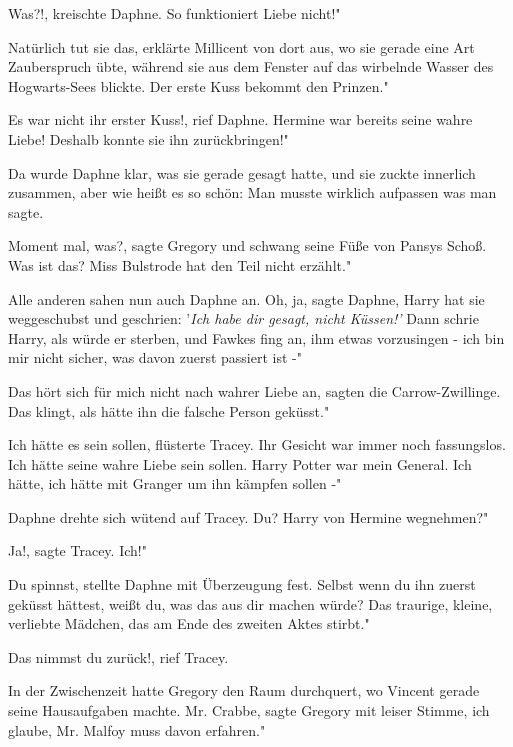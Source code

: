 \glqq{}Was?!\grqq{}, kreischte Daphne. \glqq{}So funktioniert Liebe nicht!"

\glqq{}Natürlich tut sie das\grqq{}, erklärte Millicent von dort aus, wo sie
gerade eine Art Zauberspruch übte, während sie aus dem Fenster auf das wirbelnde
Wasser des Hogwarts-Sees blickte. \glqq{}Der erste Kuss bekommt den Prinzen."

\glqq{}Es war nicht ihr erster Kuss!\grqq{}, rief Daphne. \glqq{}Hermine war
bereits seine wahre Liebe! Deshalb konnte sie ihn zurückbringen!"

Da wurde Daphne klar, was sie gerade gesagt hatte, und sie zuckte innerlich
zusammen, aber wie heißt es so schön: Man musste wirklich aufpassen was man
sagte.

\glqq{}Moment mal, was?\grqq{}, sagte Gregory und schwang seine Füße von Pansys
Schoß. \glqq{}Was ist das? Miss Bulstrode hat den Teil nicht erzählt."

Alle anderen sahen nun auch Daphne an. \glqq{}Oh, ja\grqq{}, sagte Daphne, \glqq
Harry hat sie weggeschubst und geschrien: '\emph{Ich habe dir gesagt, nicht
Küssen!'} Dann schrie Harry, als würde er sterben, und Fawkes fing an, ihm etwas
vorzusingen - ich bin mir nicht sicher, was davon zuerst passiert ist -"

\glqq{}Das hört sich für mich nicht nach wahrer Liebe an\grqq{}, sagten die
Carrow-Zwillinge. \glqq{}Das klingt, als hätte ihn die falsche Person geküsst."

\glqq{}Ich hätte es sein sollen\grqq{}, flüsterte Tracey. Ihr Gesicht war immer
noch fassungslos. \glqq{}Ich hätte seine wahre Liebe sein sollen. Harry Potter
war mein General. Ich hätte, ich hätte mit Granger um ihn kämpfen sollen -"

Daphne drehte sich wütend auf Tracey. \glqq{}Du? Harry von Hermine wegnehmen?"

\glqq{}Ja!\grqq{}, sagte Tracey. \glqq{}Ich!"

\glqq{}Du spinnst\grqq{}, stellte Daphne mit Überzeugung fest. \glqq{}Selbst wenn
du ihn zuerst geküsst hättest, weißt du, was das aus dir machen würde? Das
traurige, kleine, verliebte Mädchen, das am Ende des zweiten Aktes stirbt."

\glqq{}Das nimmst du zurück!\grqq{}, rief Tracey.

In der Zwischenzeit hatte Gregory den Raum durchquert, wo Vincent gerade seine
Hausaufgaben machte. \glqq{}Mr. Crabbe\grqq{}, sagte Gregory mit leiser Stimme,
\glqq{}ich glaube, Mr. Malfoy muss davon erfahren."


